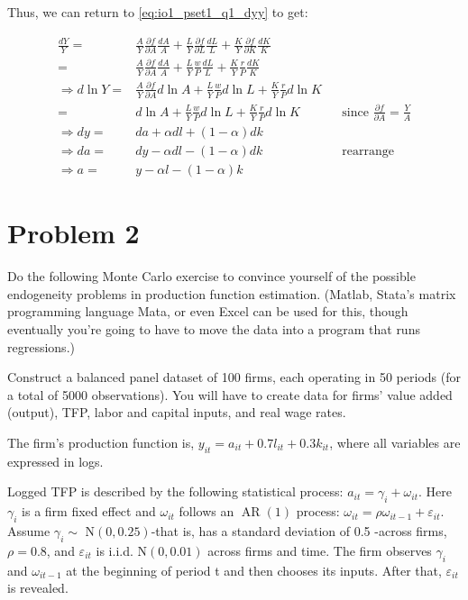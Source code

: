 \documentclass[10pt]{article}
\begin{document}
Thus, we can return to \eqref{eq:io1_pset1_q1_dyy} to get:

\begin{align}
    \frac{d Y}{Y} = &\frac{A}{Y} \frac{\partial f}{\partial A} \frac{d A}{A} + \frac{L}{Y} \frac{\partial f}{\partial L} \frac{d L}{L} + \frac{K}{Y} \frac{\partial f}{\partial K} \frac{d K}{K} \\
    = &\frac{A}{Y} \frac{\partial f}{\partial A} \frac{d A}{A} + \frac{L}{Y} \frac{w}{P} \frac{d L}{L} + \frac{K}{Y} \frac{r}{P} \frac{d K}{K} \\
    \Rightarrow d \ln Y = &\frac{A}{Y} \frac{\partial f}{\partial A} d \ln A + \frac{L}{Y} \frac{w}{P} d \ln L + \frac{K}{Y} \frac{r}{P} d \ln K \\
    = & d \ln A + \frac{L}{Y} \frac{w}{P} d \ln L + \frac{K}{Y} \frac{r}{P} d \ln K && \text{since $\frac{\partial f}{\partial A} = \frac{Y}{A}$} \\
    \Rightarrow d y = & d a + \alpha d l + (1-\alpha) d k \\
    \Rightarrow d a = & d y - \alpha d l - (1-\alpha) d k && \text{rearrange} \\ 
    \Rightarrow a = & y - \alpha l - (1-\alpha) k
\end{align}


\section{Problem 2}

Do the following Monte Carlo exercise to convince yourself of the possible 
endogeneity problems in production function estimation. (Matlab, Stata's matrix 
programming language Mata, or even Excel can be used for this, though eventually 
you're going to have to move the data into a program that runs regressions.)

Construct a balanced panel dataset of 100 firms, each operating in 50 periods 
(for a total of 5000 observations). You will have to create data for firms' value 
added (output), TFP, labor and capital inputs, and real wage rates.

The firm's production function is, $y_{i t}=a_{i t}+0.7 l_{i t}+0.3 k_{i t}$, 
where all variables are expressed in logs.

Logged TFP is described by the following statistical process: 
$a_{i t}=\gamma_i+\omega_{i t}$. Here $\gamma_i$ is a firm fixed effect and 
$\omega_{i t}$ follows an $\operatorname{AR}(1)$ process: 
$\omega_{i t}=\rho \omega_{i t-1}+\varepsilon_{i t}$. Assume 
$\gamma_i \sim$ $\mathrm{N}(0,0.25)$-that is, has a standard deviation of 0.5 -across 
firms, $\rho=0.8$, and $\varepsilon_{i t}$ is i.i.d. $\mathrm{N}(0,0.01)$ across 
firms and time. The firm observes $\gamma_i$ and $\omega_{i t-1}$ at the beginning 
of period t and then chooses its inputs. After that, $\varepsilon_{i t}$ is revealed.
\end{document}

